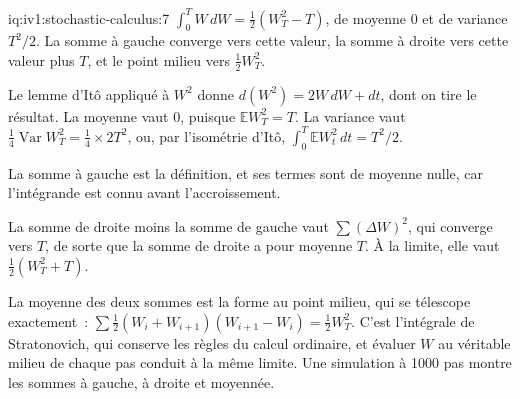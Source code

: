 \begin{solution}{iq:iv1:stochastic-calculus:7}
$\int_0^TW\,dW = \frac12(W_T^2 - T)$, de moyenne 0 et de variance $T^2/2$. La somme à gauche converge vers cette valeur, la somme à droite vers cette valeur plus $T$, et le point milieu vers $\frac12W_T^2$.

Le lemme d'Itô appliqué à $W^2$ donne $d(W^2) = 2W\,dW + dt$, dont on tire le résultat. La moyenne vaut 0, puisque $\mathbb{E}W_T^2 = T$. La variance vaut $\frac14\operatorname{Var}W_T^2 = \frac14 \times 2T^2$, ou, par l'isométrie d'Itô, $\int_0^T\mathbb{E}W_t^2\,dt = T^2/2$.

La somme à gauche est la définition, et ses termes sont de moyenne nulle, car l'intégrande est connu avant l'accroissement.

La somme de droite moins la somme de gauche vaut $\sum(\Delta W)^2$, qui converge vers $T$, de sorte que la somme de droite a pour moyenne $T$. À la limite, elle vaut $\frac12(W_T^2 + T)$.

La moyenne des deux sommes est la forme au point milieu, qui se télescope exactement~: $\sum\frac12(W_i + W_{i + 1})(W_{i + 1} - W_i) = \frac12W_T^2$. C'est l'intégrale de Stratonovich, qui conserve les règles du calcul ordinaire, et évaluer $W$ au véritable milieu de chaque pas conduit à la même limite. Une simulation à 1000 pas montre les sommes à gauche, à droite et moyennée.



\end{solution}

